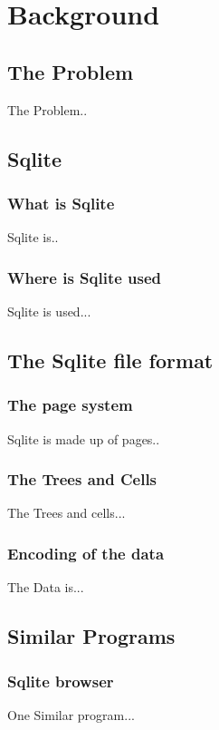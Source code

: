 \section{Background}
\label{sec:background}

\subsection{The Problem}
\label{subsec:the_problem}

The Problem..


\subsection{Sqlite}
\label{subsec:sqlite}

\subsubsection{What is Sqlite}
\label{subsubsec:what_is_sqlite}

Sqlite is..

\subsubsection{Where is Sqlite used}
\label{subsubsec:where_is_sqlite}

Sqlite is used...


\subsection{The Sqlite file format}
\label{subsec:sqlite_file_format}

\subsubsection{The page system}
\label{subsubsec:sqlite_page_system}

Sqlite is made up of pages..

\subsubsection{The Trees and Cells}
\label{subsubsec:sqlite_trees_and_cells}

The Trees and cells...

\subsubsection{Encoding of the data}
\label{subsubsec:sqlite_data_encoding}

The Data is...

\subsection{Similar Programs}
\label{subsec:similar_programs}

\subsubsection{Sqlite browser}
\label{subsubsec:sqlite_browser}

One Similar program...